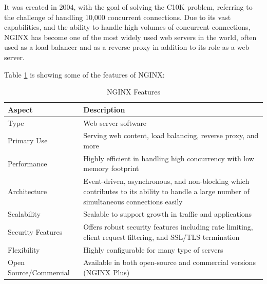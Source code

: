 It was created in 2004, with the goal of solving the C10K problem, referring to the challenge of handling 10,000 concurrent connections. \cite{nginx}
Due to its vast capabilities, and the ability to handle high volumes of concurrent connections, NGINX has become one of the most widely used web servers in the world,
often used as a load balancer and as a reverse proxy in addition to its role as a web server.

Table \ref{tab:ngnix} is showing some of the features of NGINX\cite{nginx}:

\begin{table}[H]
    \centering
    \begin{tabularx}{\textwidth}{|l|X|}
        \hline
        \textbf{Aspect}        & \textbf{Description}                                                                                                                      \\
        \hline
        Type                   & Web server software                                                                                                                       \\
        \hline
        Primary Use            & Serving web content, load balancing, reverse proxy, and more                                                                              \\
        \hline
        Performance            & Highly efficient in handling high concurrency with low memory footprint                                                                   \\
        \hline
        Architecture           & Event-driven, asynchronous, and non-blocking which contributes to its ability to handle a large number of simultaneous connections easily \\
        \hline
        Scalability            & Scalable to support growth in traffic and applications                                                                                    \\
        \hline
        Security Features      & Offers robust security features including rate limiting, client request filtering, and SSL/TLS termination                                \\
        \hline
        Flexibility            & Highly configurable for many type of servers                                                                       \\
        \hline
        Open Source/Commercial & Available in both open-source and commercial versions (NGINX Plus)                                                                        \\
        \hline
    \end{tabularx}
    \caption{NGINX Features}
    \label{tab:ngnix}
    
\end{table}

